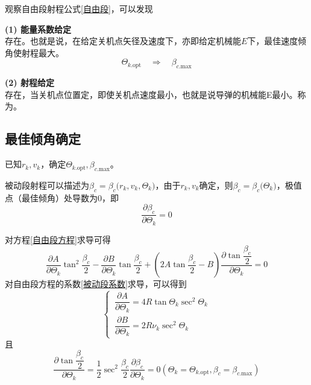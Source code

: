 \clearpage
观察自由段射程公式\eqref{自由段}，可以发现

\textbf{(1) \hspace*{0.5em} 能量系数给定}\\
\hspace*{2em} 存在\red[最佳速度倾角使射程最大]。也就是说，在给定关机点矢径及速度下，亦即给定机械能$E$下，最佳速度倾角使射程最大。
\begin{equation*}
	\varTheta_{k\text{.opt}} \quad \Rightarrow \quad \beta_{c\text{.max}}
\end{equation*}

\textbf{(2) \hspace*{0.5em} 射程给定}\\
\hspace*{2em} 存在\red[最佳速度倾角使能量系数最小]，当关机点位置定，即使关机点速度最小，也就是说导弹的机械能E最小。称为。


\subsection{最佳倾角确定}

已知$r_k, v_k$，确定$\varTheta_{k\text{.opt}}, \beta_{c\text{.max}}$。

被动段射程可以描述为$\beta_c = \beta_c\big(r_k, v_k, \varTheta_k\big)$，由于$r_k, v_k$确定，则$\beta_c = \beta_c\big(\varTheta_k\big)$，极值点（最佳倾角）处导数为0，即
\begin{equation}
	\dfrac{\partial \beta_c}{\partial \varTheta_k} = 0
\end{equation}

对方程\eqref{自由段方程}求导可得
\begin{equation}
	\dfrac{\partial A}{\partial \varTheta_k} \tan^2 \dfrac{\beta_c}{2} - \dfrac{\partial B}{\partial \varTheta_k} \tan \dfrac{\beta_c}{2} + \left(2 A \tan \dfrac{\beta_c }{2} - B\right)\dfrac{\partial \tan \dfrac{\beta_c}{2}}{\partial \varTheta_k} = 0
\end{equation}
对自由段方程的系数\eqref{被动段系数}求导，可以得到
\begin{equation}
	\begin{cases}
		\, \dfrac{\partial A}{\partial \varTheta_k} = 4R\tan \varTheta_k\sec^2\varTheta_k \\[0.8em]
		\, \dfrac{\partial B}{\partial \varTheta_k} = 2R\nu_k \sec^2 \varTheta_k
	\end{cases}
\end{equation}
且
\begin{equation}
	\dfrac{\partial \tan \dfrac{\beta_c}{2}}{\partial \varTheta_k} = \dfrac{1}{2} \sec^2 \dfrac{\beta_c}{2} \dfrac{\partial \beta_c}{\partial \varTheta_k} = 0(\varTheta_k = \varTheta_{k\text{.opt}}, \beta_c = \beta_{c\text{.max}})
\end{equation}

